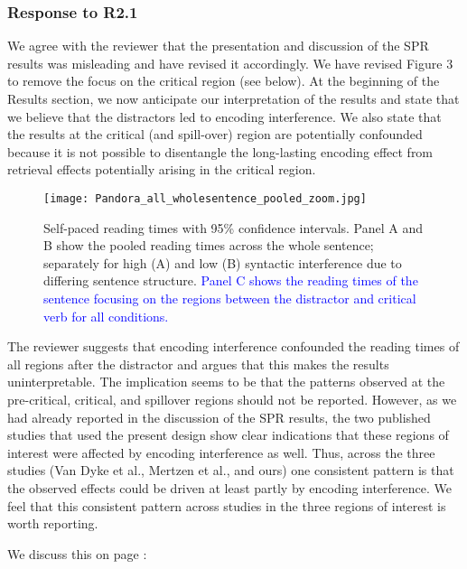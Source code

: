 \documentclass[12pt]{article}
\begin{document}
\subsubsection*{Response to R2.1}
We agree with the reviewer that the presentation and discussion of the SPR results was misleading and have revised it accordingly. We have revised Figure 3 to remove the focus on the critical region (see below). At the beginning of the Results section, we now anticipate our interpretation of the results and state that we believe that the distractors led to encoding interference. We also state that the results at the critical (and spill-over) region are potentially confounded because it is not possible to disentangle the long-lasting encoding effect from retrieval effects potentially arising in the critical region. 

\setcounter{figure}{2}

\begin{sidewaysfigure}[h]
    \caption{Self-paced reading times with 95\% confidence intervals. Panel A and B show the pooled reading times across the whole sentence; separately for high (A) and low (B) syntactic interference due to differing sentence structure. \textcolor{blue}{Panel C shows the reading times of the sentence focusing on the regions between the distractor and critical verb for all conditions.}}
    \label{fig:whole_sentence}
    \centering
    \texttt{[image: Pandora\_all\_wholesentence\_pooled\_zoom.jpg]}
\end{sidewaysfigure}
\clearpage

The reviewer suggests that encoding interference confounded the reading times of all regions after the distractor and argues that this makes the results uninterpretable. The implication seems to be that the patterns observed at the pre-critical, critical, and spillover regions should not be reported.
 However, as we had already reported in the discussion of the SPR results, the two published studies that used the present design \citep{vandyke07, mertzen} show clear indications that these regions of interest were affected by encoding interference as well. Thus, across the three studies (Van Dyke et al., Mertzen et al., and ours) one consistent pattern is that the observed effects could be driven at least partly by encoding interference. We feel that this consistent pattern across studies in the three regions of interest is worth reporting.

We discuss this on page \pageref{previous_encoding}:
\end{document}
